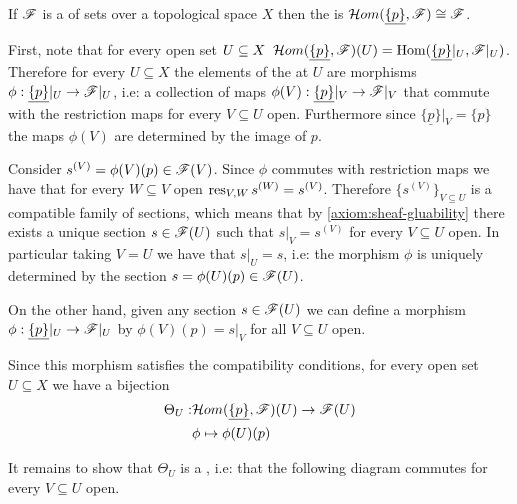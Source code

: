 \documentclass[../main.tex]{subfiles}
\begin{document}
\begin{example}
  If \(\mathscr{F}\) is a  of sets over a topological space \(X\) then the  is \(\mathcal{H}om(\underline{\{p\}}, \mathscr{F}) \cong \mathscr{F}\).

  First, note that for every open set \(U \subseteq X \;\; \mathcal{H}om(\underline{\{p\}}, \mathscr{F})(U) = \operatorname{Hom}(\underline{\{p\}}|_{U}, \mathscr{F}|_{U})\).
  Therefore for every \(U \subseteq X\) the elements of the  at \(U\) are morphisms\\ \(\phi: \underline{\{p\}}|_{U} \to \mathscr{F}|_{U}\), i.e: a collection of maps \(\phi(V): \underline{\{p\}}|_{V} \to \mathscr{F}|_{V}\) that commute with the restriction maps for every \(V \subseteq U\) open.
  Furthermore since \(\underline{\{p\}}|_{V} = \{p\}\) the maps \(\phi(V)\) are determined by the image of \(p\).

  Consider \(s^{(V)} = \phi(V)(p) \in \mathscr{F}(V)\).
  Since \(\phi\) commutes with restriction maps we have that for every \(W \subseteq V\) open \(\operatorname{res}_{V, W} s^{(W)} = s^{(V)}\).
  Therefore \(\{s^{(V)}\}_{V \subseteq U}\) is a compatible family of sections, which means that by \ref{axiom:sheaf-gluability} there exists a unique section \(s \in \mathscr{F}(U)\) such that \(s|_{V} = s^{(V)}\) for every \(V \subseteq U\) open.
  In particular taking \(V = U\) we have that \(s|_{U} = s\), i.e: the morphism \(\phi\) is uniquely determined by the section \(s = \phi(U)(p) \in \mathscr{F}(U)\).

  On the other hand, given any section \(s \in \mathscr{F}(U)\) we can define a morphism\\ \(\phi: \underline{\{p\}}|_{U} \to \mathscr{F}|_{U}\) by \(\phi(V)(p) = s|_{V}\) for all \(V \subseteq U\) open.

  Since this morphism satisfies the compatibility conditions, for every open set \(U \subseteq X\) we have a bijection
  \begin{align*}
    \Theta_{U}:& \mathcal{H}om(\underline{\{p\}}, \mathscr{F})(U) \to \mathscr{F}(U) \\
    & \phi \mapsto \phi(U)(p)
  \end{align*}

  It remains to show that \(\Theta_{U}\) is a , i.e: that the following diagram commutes for every \(V \subseteq U\) open.
  \begin{center}
  \end{center}


\end{example}
\end{document}
